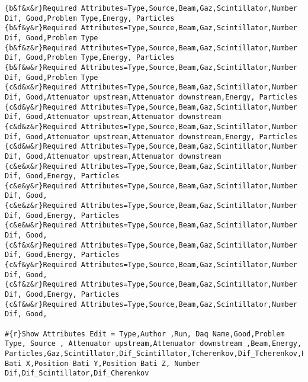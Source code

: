 {\begin{lstlisting}[breaklines=true,basicstyle=\tiny,postbreak=\mbox{\textcolor{red}{$\hookrightarrow$}\space},]
{b&f&x&r}Required Attributes=Type,Source,Beam,Gaz,Scintillator,Number Dif, Good,Problem Type,Energy, Particles
{b&f&y&r}Required Attributes=Type,Source,Beam,Gaz,Scintillator,Number Dif, Good,Problem Type
{b&f&z&r}Required Attributes=Type,Source,Beam,Gaz,Scintillator,Number Dif, Good,Problem Type,Energy, Particles
{b&f&w&r}Required Attributes=Type,Source,Beam,Gaz,Scintillator,Number Dif, Good,Problem Type
{c&d&x&r}Required Attributes=Type,Source,Beam,Gaz,Scintillator,Number Dif, Good,Attenuator upstream,Attenuator downstream,Energy, Particles
{c&d&y&r}Required Attributes=Type,Source,Beam,Gaz,Scintillator,Number Dif, Good,Attenuator upstream,Attenuator downstream
{c&d&z&r}Required Attributes=Type,Source,Beam,Gaz,Scintillator,Number Dif, Good,Attenuator upstream,Attenuator downstream,Energy, Particles
{c&d&w&r}Required Attributes=Type,Source,Beam,Gaz,Scintillator,Number Dif, Good,Attenuator upstream,Attenuator downstream
{c&e&x&r}Required Attributes=Type,Source,Beam,Gaz,Scintillator,Number Dif, Good,Energy, Particles
{c&e&y&r}Required Attributes=Type,Source,Beam,Gaz,Scintillator,Number Dif, Good,
{c&e&z&r}Required Attributes=Type,Source,Beam,Gaz,Scintillator,Number Dif, Good,Energy, Particles
{c&e&w&r}Required Attributes=Type,Source,Beam,Gaz,Scintillator,Number Dif, Good,
{c&f&x&r}Required Attributes=Type,Source,Beam,Gaz,Scintillator,Number Dif, Good,Energy, Particles
{c&f&y&r}Required Attributes=Type,Source,Beam,Gaz,Scintillator,Number Dif, Good,
{c&f&z&r}Required Attributes=Type,Source,Beam,Gaz,Scintillator,Number Dif, Good,Energy, Particles
{c&f&w&r}Required Attributes=Type,Source,Beam,Gaz,Scintillator,Number Dif, Good,

#{r}Show Attributes Edit = Type,Author ,Run, Daq Name,Good,Problem Type, Source , Attenuator upstream,Attenuator downstream ,Beam,Energy, Particles,Gaz,Scintillator,Dif_Scintillator,Tcherenkov,Dif_Tcherenkov,Position Bati X,Position Bati Y,Position Bati Z, Number Dif,Dif_Scintillator,Dif_Cherenkov


\end{lstlisting}}
